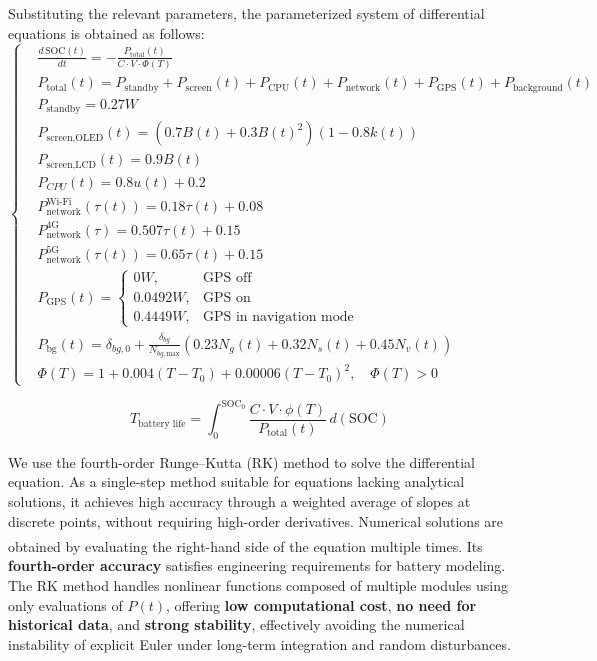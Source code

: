 \documentclass{mcmthesis}  %
\newcommand{\upcite}[1]{\textsuperscript{\textsuperscript{\cite{#1}}}}
\begin{document}
	Substituting the relevant parameters, the parameterized system of differential equations is obtained as follows:
	\begin{equation}
		\left\{
		\begin{aligned}
			&\frac{d\,\text{SOC}(t)}{dt} = -\frac{P_{\text{total}}(t)}{C \cdot V \cdot \Phi(T)} 
			\\
			&P_{\text{total}}(t) = P_{\text{standby}} + P_{\text{screen}}(t) + P_{\text{CPU}}(t) + P_{\text{network}}(t) + P_{\text{GPS}}(t) + P_{\text{background}}(t) 
			\\
			&P_{\text{standby}}= 0.27W\\
			&P_{\text{screen,OLED}}(t) =\left( 0.7B(t) + 0.3B(t)^2 \right) \left( 1 - 0.8k(t) \right) 
			\\
			&P_{\text{screen,LCD}}(t) = 0.9 B(t)
			\\
			&P_{CPU}(t)=0.8u(t)+0.2 
			\\
			&P_{\text{network}}^{\text{Wi-Fi}}(\tau(t)) = 0.18\tau(t) + 0.08
			\\
			&P_{\text{network}}^{4\text{G}}(\tau) = 0.507\tau(t) + 0.15  
			\\
			&P_{\text{network}}^{5\text{G}}(\tau(t)) = 0.65\tau(t) + 0.15
			\\
			&P_{\text{GPS}}(t) =
			\begin{cases}
				0W, & \text{GPS off} \\
				0.0492W, & \text{GPS on} \\
				0.4449W, & \text{GPS in navigation mode}
			\end{cases}
			\\
			&P_{\text{bg}}(t) = \delta_{bg,0} + \frac{\delta_{bg}}{N_{bg,\text{max}}} \left( 0.23 N_g(t) + 0.32 N_s(t) + 0.45 N_v(t) \right)
			\\
			& \Phi(T) = 1 + 0.004(T - T_0) + 0.00006(T - T_0)^2,\quad \Phi(T) > 0
		\end{aligned}
		\right.
	\end{equation}
	
	\begin{equation}
		T_{\text{battery life}} = \int_{0}^{\text{SOC}_0} \frac{C \cdot V \cdot \phi(T)}{P_{\text{total}}(t)} \, d(\text{SOC})
	\end{equation}
	
	We use the fourth-order Runge--Kutta (RK) method to solve the differential equation. As a single-step method suitable for equations lacking analytical solutions, it achieves high accuracy through a weighted average of slopes at discrete points, without requiring high-order derivatives. Numerical solutions are obtained by evaluating the right-hand side of the equation multiple times\upcite{8}. Its \textbf{fourth-order accuracy} satisfies engineering requirements for battery modeling. The RK method handles nonlinear functions composed of multiple modules using only evaluations of \( P(t) \), offering \textbf{low computational cost}, \textbf{no need for historical data}, and \textbf{strong stability}, effectively avoiding the numerical instability of explicit Euler under long-term integration and random disturbances.
	
\end{document}
